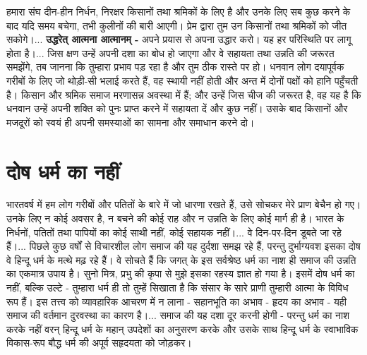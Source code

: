 हमारा संघ दीन-हीन निर्धन, निरक्षर किसानों तथा श्रमिकों के लिए है और उनके लिए सब कुछ करने के बाद यदि समय बचेगा, तभी कुलीनों की बारी आएगी। प्रेम द्वारा तुम उन किसानों तथा श्रमिकों को जीत सकोगे।... \textbf{उद्धरेत् आत्मना आत्मानम् - } अपने प्रयास से अपना उद्धार करो। यह हर परिस्थिति पर लागू होता है।... जिस क्षण उन्हें अपनी दशा का बोध हो जाएगा और वे सहायता तथा उन्नति की जरूरत समझेंगे, तब जानना कि तुम्हारा प्रभाव पड़ रहा है और तुम ठीक रास्ते पर हो। धनवान लोग दयापूर्वक गरीबों के लिए जो थोड़ी-सी भलाई करते हैं, वह स्थायी नहीं होती और अन्त में दोनों पक्षों को हानि पहुँचती है। किसान और श्रमिक समाज मरणासन्न अवस्था में हैं; और उन्हें जिस चीज की जरूरत है, वह यह है कि धनवान उन्हें अपनी शक्ति को पुनः प्राप्त करने में सहायता दें और कुछ नहीं। उसके बाद किसानों और मजदूरों को स्वयं ही अपनी समस्याओं का सामना और समाधान करने दो।


\section*{दोष धर्म का नहीं}


भारतवर्ष में हम लोग गरीबों और पतितों के बारे में जो धारणा रखते हैं, उसे सोचकर मेरे प्राण बेचैन हो गए। उनके लिए न कोई अवसर है, न बचने की कोई राह और न उन्नति के लिए कोई मार्ग ही है। भारत के निर्धनों, पतितों तथा पापियों का कोई साथी नहीं, कोई सहायक नहीं।... वे दिन-पर-दिन डूबते जा रहे हैं।... पिछले कुछ वर्षों से विचारशील लोग समाज की यह दुर्दशा समझ रहे हैं, परन्तु दुर्भाग्यवश इसका दोष वे हिन्दू धर्म के मत्थे मढ़ रहे हैं। वे सोचते हैं कि जगत् के इस सर्वश्रेष्ठ धर्म का नाश ही समाज की उन्नति का एकमात्र उपाय है। सुनो मित्र, प्रभु की कृपा से मुझे इसका रहस्य ज्ञात हो गया है। इसमें दोष धर्म का नहीं, बल्कि उल्टे - तुम्हारा धर्म ही तो तुम्हें सिखाता है कि संसार के सारे प्राणी तुम्हारी आत्मा के विविध रूप हैं। इस तत्त्व को व्यावहारिक आचरण में न लाना - सहानभूति का अभाव - हृदय का अभाव - यही समाज की वर्तमान दुरवस्था का कारण है।... समाज की यह दशा दूर करनी होगी - परन्तु धर्म का नाश करके नहीं वरन् हिन्दू धर्म के महान् उपदेशों का अनुसरण करके और उसके साथ हिन्दू धर्म के स्वाभाविक विकास-रूप बौद्ध धर्म की अपूर्व सहृदयता को जोड़कर। 


